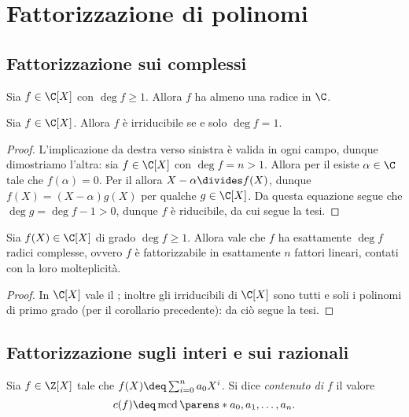 \section{Fattorizzazione di polinomi}

\subsection{Fattorizzazione sui complessi}

\begin{theorem} \label{th:fondamentale_algebra}
    Sia $f \in \C[X]$ con $\deg f \geq 1$. Allora $f$ ha almeno una radice in $\C$.
\end{theorem}

\begin{corollary}
     Sia $f \in \C[X]$. Allora $f$ è irriducibile se e solo $\deg f = 1$.
\end{corollary}
\begin{proof}
    L'implicazione da destra verso sinistra è valida in ogni campo, dunque dimostriamo l'altra: sia $f \in \C[X]$ con $\deg f = n > 1$. Allora per il  esiste $\alpha \in \C$ tale che $f(\alpha) = 0$. Per il  allora $X-\alpha \divides f(X)$, dunque $f(X) = (X-\alpha)g(X)$ per qualche $g \in \C[X]$. Da questa equazione segue che $\deg g = \deg f - 1 > 0$, dunque $f$ è riducibile, da cui segue la tesi.
\end{proof}

\begin{corollary}
    Sia $f(X) \in \C[X]$ di grado $\deg f \geq 1$. Allora vale che $f$ ha esattamente $\deg f$ radici complesse, ovvero $f$ è fattorizzabile in esattamente $n$ fattori lineari, contati con la loro molteplicità.
\end{corollary}
\begin{proof}
    In $\C[X]$ vale il ; inoltre gli irriducibili di $\C[X]$ sono tutti e soli i polinomi di primo grado (per il corollario precedente): da ciò segue la tesi.
\end{proof}

\subsection{Fattorizzazione sugli interi e sui razionali}

\begin{definition}
    Sia $f \in \Z[X]$ tale che $f(X) \deq \sum_{i=0}^n a_0X^i$. Si dice \emph{contenuto di $f$} il valore \[
        c(f) \deq \operatorname{mcd}\parens*{a_0, a_1, \dots, a_n}. 
    \]
\end{definition}

